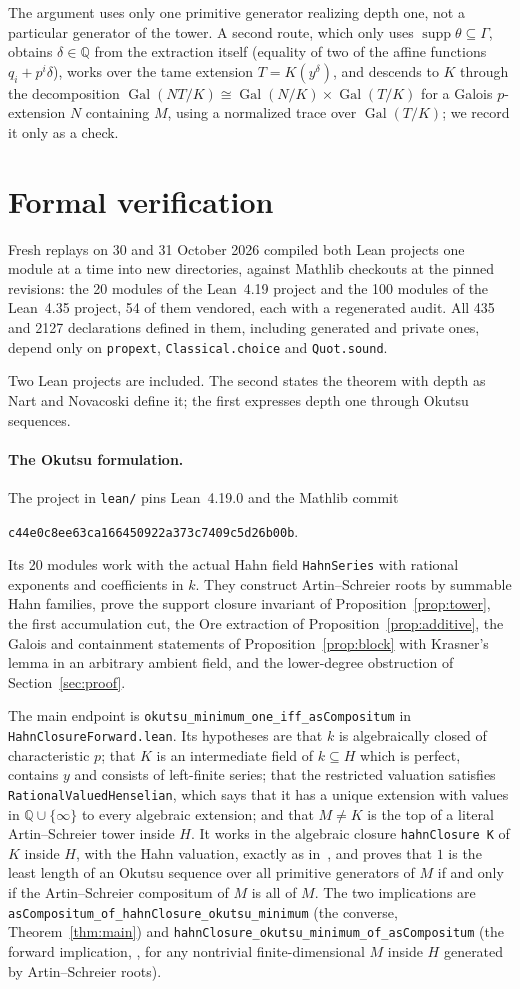 \documentclass[11pt]{article}
\newcommand{\code}[1]{\nolinkurl{#1}}
\newcommand{\Q}{\mathbb Q}
\newcommand{\supp}{\operatorname{supp}}
\newcommand{\Gal}{\operatorname{Gal}}
\newcommand{\replaystatus}{Fresh replays on 30 and 31 October 2026 compiled both Lean projects one module at a time into new directories, against Mathlib checkouts at the pinned revisions: the 20 modules of the Lean~4.19 project and the 100 modules of the Lean~4.35 project, 54 of them vendored, each with a regenerated audit. All 435 and 2127 declarations defined in them, including generated and private ones, depend only on \code{propext}, \code{Classical.choice} and \code{Quot.sound}.}
\begin{document}
The argument uses only one primitive generator realizing depth one, not a particular generator of the tower. A second route, which only uses $\supp\theta\subseteq\Gamma$, obtains $\delta\in\Q$ from the extraction itself (equality of two of the affine functions $q_i+p^i\delta$), works over the tame extension $T=K(y^\delta)$, and descends to $K$ through the decomposition $\Gal(NT/K)\cong\Gal(N/K)\times\Gal(T/K)$ for a Galois $p$-extension $N$ containing $M$, using a normalized trace over $\Gal(T/K)$; we record it only as a check.

\section{Formal verification}\label{sec:lean}

\replaystatus

Two Lean projects are included. The second states the theorem with depth as Nart and Novacoski define it; the first expresses depth one through Okutsu sequences.

\paragraph{The Okutsu formulation.} The project in \code{lean/} pins Lean~4.19.0 and the Mathlib commit
\begin{center}\code{c44e0c8ee63ca166450922a373c7409c5d26b00b}.\end{center}
Its 20 modules work with the actual Hahn field \code{HahnSeries} with rational exponents and coefficients in $k$. They construct Artin--Schreier roots by summable Hahn families, prove the support closure invariant of Proposition~\ref{prop:tower}, the first accumulation cut, the Ore extraction of Proposition~\ref{prop:additive}, the Galois and containment statements of Proposition~\ref{prop:block} with Krasner's lemma in an arbitrary ambient field, and the lower-degree obstruction of Section~\ref{sec:proof}.

The main endpoint is \code{okutsu_minimum_one_iff_asCompositum} in \code{HahnClosureForward.lean}. Its hypotheses are that $k$ is algebraically closed of characteristic $p$; that $K$ is an intermediate field of $k\subseteq H$ which is perfect, contains $y$ and consists of left-finite series; that the restricted valuation satisfies \code{RationalValuedHenselian}, which says that it has a unique extension with values in $\Q\cup\{\infty\}$ to every algebraic extension; and that $M\ne K$ is the top of a literal Artin--Schreier tower inside $H$. It works in the algebraic closure \code{hahnClosure K} of $K$ inside $H$, with the Hahn valuation, exactly as in~\cite[\S3]{NN}, and proves that $1$ is the least length of an Okutsu sequence over all primitive generators of $M$ if and only if the Artin--Schreier compositum of $M$ is all of $M$. The two implications are \code{asCompositum_of_hahnClosure_okutsu_minimum} (the converse, Theorem~\ref{thm:main}) and \code{hahnClosure_okutsu_minimum_of_asCompositum} (the forward implication, \cite[Theorem~3.15]{NN}, for any nontrivial finite-dimensional $M$ inside $H$ generated by Artin--Schreier roots).
\end{document}
